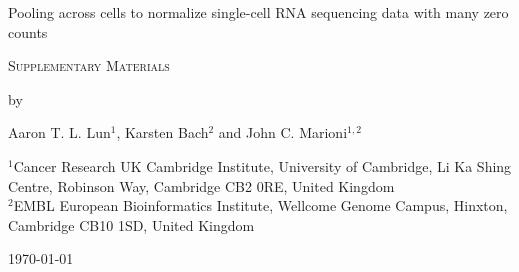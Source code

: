 \documentclass{article}
\begin{document}
\begin{titlepage}
\vspace*{3cm}
\begin{center}

{\LARGE
Pooling across cells to normalize single-cell RNA sequencing data with many zero counts
\par}

\vspace{0.75cm}

{\Large 
    \textsc{Supplementary Materials}
\par
}
\vspace{0.75cm}

\large
by

\vspace{0.75cm}
Aaron T. L. Lun$^{1}$, Karsten Bach$^{2}$ and John C. Marioni$^{1,2}$

\vspace{1cm}
\begin{minipage}{0.9\textwidth}
\begin{flushleft} 
$^1$Cancer Research UK Cambridge Institute, University of Cambridge, Li Ka Shing Centre, Robinson Way, Cambridge CB2 0RE, United Kingdom \\[6pt]
$^2$EMBL European Bioinformatics Institute, Wellcome Genome Campus, Hinxton, Cambridge CB10 1SD, United Kingdom \\[6pt]
\end{flushleft}
\end{minipage}

\vspace{1.5cm}
{\large \today{}}

\vspace*{\fill}
\end{center}
\end{titlepage}
\end{document}
